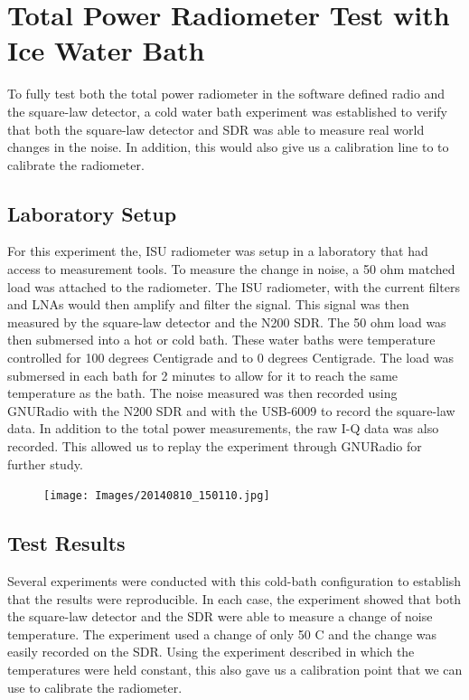 \section{Total Power Radiometer Test with Ice Water Bath}
To fully test both the total power radiometer in the software defined radio and the square-law detector, a cold water bath experiment was established to verify that both the square-law detector and SDR was able to measure real world changes in the noise.  In addition, this would also give us a calibration line to to calibrate the radiometer.

\subsection{Laboratory Setup}
For this experiment the, ISU radiometer was setup in a laboratory that had access to measurement tools.  To measure the change in noise, a 50 ohm matched load was attached to the radiometer.  The ISU radiometer, with the current filters and LNAs would then amplify and filter the signal.  This signal was then measured by the square-law detector and the N200 SDR.  The 50 ohm load was then submersed into a hot or cold bath.  These water baths were temperature controlled for 100 degrees Centigrade and to 0 degrees Centigrade.  The load was submersed in each bath for 2 minutes to allow for it to reach the same temperature as the bath.  The noise measured was then recorded using GNURadio with the N200 SDR and with the USB-6009 to record the square-law data.  In addition to the total power measurements, the raw I-Q data was also recorded.  This allowed us to replay the experiment through GNURadio for further study.

\begin{figure}[h!tb] \centering

\texttt{[image: Images/20140810\_150110.jpg]}

\label{LabSetup}
\end{figure}

\subsection{Test Results}

Several experiments were conducted with this cold-bath configuration to establish that the results were reproducible.  In each case, the experiment showed that both the square-law detector and the SDR were able to measure a change of noise temperature.  The experiment used a change of only 50 C and the change was easily recorded on the SDR.  Using the experiment described in which the temperatures were held constant, this also gave us a calibration point that we can use to calibrate the radiometer.

